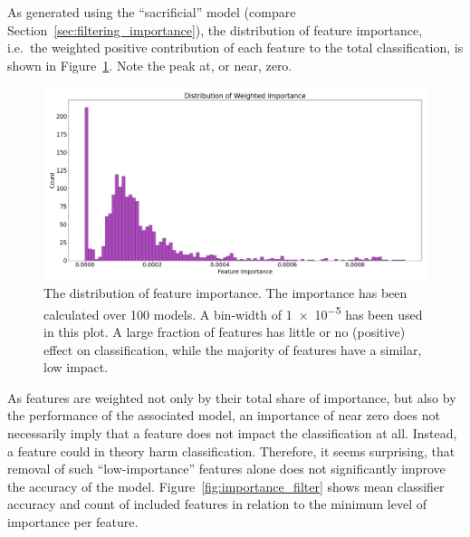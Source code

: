 

As generated using the \enquote{sacrificial} model (compare 
Section~\ref{sec:filtering_importance}), the distribution of feature 
importance, i.e.~the weighted positive contribution of each feature to the total 
classification, is shown in Figure~\ref{fig:importance_dist}. Note the peak at, 
or near, zero.

\begin{figure}[H]
    \centering
    \includegraphics[width=\textwidth]{img/feature_importance_dist.png}
    \caption{The distribution of feature importance. The importance has been calculated over 100 models. A bin-width of \num{1e-5} has been used in this plot. A large fraction of features has little or no (positive) effect on classification, while the majority of features have a similar, low impact.}\label{fig:importance_dist}
\end{figure}

As features are weighted not only by their total share of importance, but also 
by the performance of the associated model, an importance of near zero does not
necessarily imply that a feature does not impact the classification at all. Instead, a feature could in theory harm 
classification. Therefore, it seems surprising, that removal of such 
\enquote{low-importance} features alone does not significantly improve the 
accuracy of the model. Figure~\ref{fig:importance_filter} shows mean classifier
accuracy and count of included features in relation to the minimum level of 
importance per feature. 


